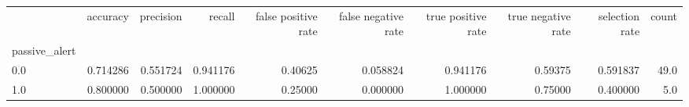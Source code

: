 \begin{tabular}{lrrrrrrrrr}
\toprule
{} &  accuracy &  precision &    recall &  false positive rate &  false negative rate &  true positive rate &  true negative rate &  selection rate &  count \\
passive\_alert &           &            &           &                      &                      &                     &                     &                 &        \\
\midrule
0.0           &  0.714286 &   0.551724 &  0.941176 &              0.40625 &             0.058824 &            0.941176 &             0.59375 &        0.591837 &   49.0 \\
1.0           &  0.800000 &   0.500000 &  1.000000 &              0.25000 &             0.000000 &            1.000000 &             0.75000 &        0.400000 &    5.0 \\
\bottomrule
\end{tabular}
